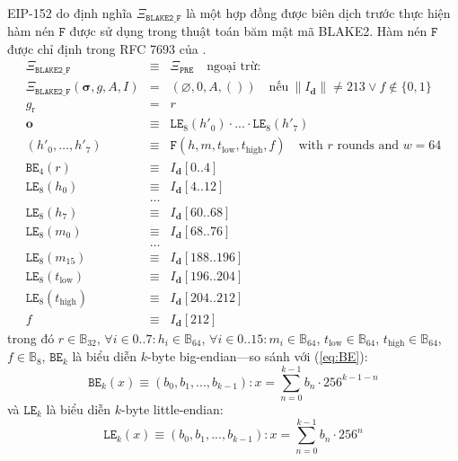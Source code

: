\documentclass[9pt,oneside]{amsart}
\begin{document}
EIP-152 do \cite{EIP-152} định nghĩa $\Xi_{\mathtt{BLAKE2\_F}}$ là một hợp đồng được biên dịch trước thực hiện hàm nén $\mathtt{F}$ được sử dụng trong thuật toán băm mật mã BLAKE2.
Hàm nén $\mathtt{F}$ được chỉ định trong RFC 7693 của \cite{RFC-7693}.
\begin{eqnarray}
  \Xi_{\mathtt{BLAKE2\_F}}&\equiv&\Xi_{\mathtt{PRE}}\quad\text{ngoại trừ:}\\
  \Xi_{\mathtt{BLAKE2\_F}}(\boldsymbol\sigma,g,A,I)&=&\left(\varnothing,0,A,()\right)\quad\text{nếu}\ \lVert I_{\mathbf{d}}\rVert \neq 213 \vee f \notin \{0, 1\} \\
  g_{\mathrm{r}} &=& r\\
  \mathbf{o} &\equiv& \mathtt{LE}_8(h'_0)\cdot ... \cdot \mathtt{LE}_8(h'_7) \\
  (h'_0,\dots,h'_7) &\equiv& \mathtt{F}(h, m, t_\mathrm{low}, t_\mathrm{high}, f) \quad\text{with } r \text{ rounds and } w = 64 \\
  \mathtt{BE}_4(r) &\equiv& I_{\mathbf{d}}[0..4] \\
  \mathtt{LE}_8(h_0) &\equiv& I_{\mathbf{d}}[4..12] \\
  &\dots& \\
  \mathtt{LE}_8(h_7) &\equiv& I_{\mathbf{d}}[60..68] \\
  \mathtt{LE}_8(m_0) &\equiv& I_{\mathbf{d}}[68..76] \\
  &\dots& \\
  \mathtt{LE}_8(m_{15}) &\equiv& I_{\mathbf{d}}[188..196] \\
  \mathtt{LE}_8(t_\mathrm{low}) &\equiv& I_{\mathbf{d}}[196..204] \\
  \mathtt{LE}_8(t_\mathrm{high}) &\equiv& I_{\mathbf{d}}[204..212] \\
  f &\equiv& I_{\mathbf{d}}[212]
\end{eqnarray}
trong đó $r \in \mathbb{B}_{32}$, $\forall i \in 0..7: h_i \in \mathbb{B}_{64}$, $\forall i \in 0..15: m_i \in \mathbb{B}_{64}$,
$t_\mathrm{low} \in \mathbb{B}_{64}$, $t_\mathrm{high} \in \mathbb{B}_{64}$, $f \in \mathbb{B}_8$,
$\mathtt{BE}_k$ là biểu diễn $k$-byte big-endian---so sánh với (\ref{eq:BE}):
\begin{equation}
  \mathtt{BE}_k(x) \equiv (b_0, b_1, ..., b_{k-1}): x = \sum_{n = 0}^{k-1} b_n \cdot 256^{k-1-n}
\end{equation}
và $\mathtt{LE}_k$ là biểu diễn $k$-byte little-endian:
\begin{equation}
  \mathtt{LE}_k(x) \equiv (b_0, b_1, ..., b_{k-1}): x = \sum_{n = 0}^{k-1} b_n \cdot 256^n
\end{equation}
\end{document}
